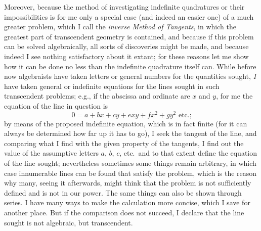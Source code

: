 \documentclass[polutonikogreek,english,twoside,openright]{article}
\begin{document}
Moreover, because the method of investigating indefinite quadratures
or their impossibilities is for me only a special case (and indeed an
easier one) of a much greater problem, which I call the {\em inverse
  Method of Tangents}, in which
the greatest part of transcendent geometry is contained, and because
if this problem can be solved algebraically, all sorts of discoveries
might be made, and because indeed I see nothing satisfactory about it
extant; for these reasons let me show how it can be done no less than
the indefinite quadrature itself can.  While before now algebraists
have taken letters or general numbers for the quantities sought, {\em
  I} have taken general or indefinite equations for the lines sought
in such transcendent problems; e.g., if the abscissa and ordinate are
$x$ and $y$, for me the equation of the line in question is
$$ 0 = a + bx + cy + exy + fx^2 + gy^2 \mbox{ etc.;}$$ 
by means of the proposed indefinite equation, which is in fact finite
(for it can always be determined how far up it has to go), I seek the
tangent of the line, and comparing what I find with the given property
of the tangents, I find out the value of the assumptive letters $a$,
$b$, $c$, etc.\ and to that extent define the equation of the line
sought; nevertheless sometimes
some things remain arbitrary, in which case innumerable lines can be
found that satisfy the problem, which is the reason why many, seeing
it afterwards, might think that the problem is not sufficiently
defined and is not in our power.  The same things can also be shown
through series.  I have many ways to make the calculation more
concise, which I save for another place.  But if the comparison does
not succeed, I declare that the line sought is not algebraic, but
transcendent.
\end{document}
